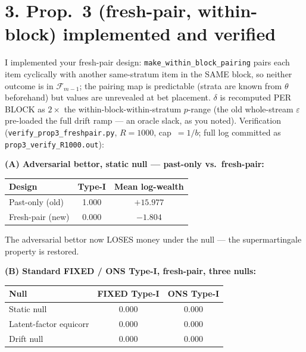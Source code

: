 \documentclass[11pt,a4paper]{article}
\begin{document}
\section*{3. Prop.\ 3 (fresh-pair, within-block) implemented and verified}

I implemented your fresh-pair design: \texttt{make\_within\_block\_pairing} pairs each
item cyclically with another same-stratum item in the SAME block, so neither outcome
is in $\mathcal{F}_{m-1}$; the pairing map is predictable (strata are known from
$\theta$ beforehand) but values are unrevealed at bet placement. $\delta$ is
recomputed PER BLOCK as $2 \times$ the within-block-within-stratum $p$-range (the
old whole-stream $\varepsilon$ pre-loaded the full drift ramp --- an oracle slack, as
you noted). Verification (\texttt{verify\_prop3\_freshpair.py}, $R = 1000$,
cap~$= 1/b$; full log committed as \texttt{prop3\_verify\_R1000.out}):

\bigskip

\noindent\textbf{(A) Adversarial bettor, static null --- past-only vs.\ fresh-pair:}

\medskip
\begin{center}
\begin{tabular}{lcc}
\toprule
Design & Type-I & Mean log-wealth \\
\midrule
Past-only (old) & 1.000 & $+15.977$ \\
Fresh-pair (new) & 0.000 & $-1.804$ \\
\bottomrule
\end{tabular}
\end{center}

\medskip
\noindent The adversarial bettor now LOSES money under the null --- the
supermartingale property is restored.

\bigskip

\noindent\textbf{(B) Standard FIXED / ONS Type-I, fresh-pair, three nulls:}

\medskip
\begin{center}
\begin{tabular}{lcc}
\toprule
Null & FIXED Type-I & ONS Type-I \\
\midrule
Static null & 0.000 & 0.000 \\
Latent-factor equicorr & 0.000 & 0.000 \\
Drift null & 0.000 & 0.000 \\
\bottomrule
\end{tabular}
\end{center}
\end{document}
